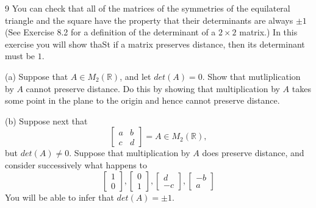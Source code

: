 \begin{problem}{9}
    You can check that all of the matrices of the 
    symmetries of the equilateral triangle and the 
    square have the property that their determinants 
    are always $\pm 1$ (See Exercise 8.2 for a 
    definition of the determinant of a $2 \times 2$
    matrix.) In this exercise you will show thaSt if a 
    matrix preserves distance, then its determinant 
    must be $1$.

    (a) Suppose that $A \in M_2(\mathbb{R})$, and let 
        $det(A) = 0$. Show that mutliplication by $A$ 
        cannot preserve distance. Do this by showing that 
        multiplication by $A$ takes some point in the plane 
        to the origin and hence cannot preserve distance.

    (b) Suppose next that 
        \[\begin{bmatrix}
            a & b \\
            c & d
        \end{bmatrix} = A \in M_2(\mathbb{R}),\]
        but $det(A) \ne 0$. Suppose that multiplication 
        by $A$ does preserve distance, and consider 
        successively what happens to 
        \[\begin{bmatrix}
            1 \\ 0
        \end{bmatrix},
        \begin{bmatrix}
            0 \\ 1
        \end{bmatrix}, 
        \begin{bmatrix}
            d \\ -c
        \end{bmatrix},
        \begin{bmatrix}
            -b \\ a
        \end{bmatrix}\]
        You will be able to infer that $det(A) = \pm 1$.
\end{problem}
\solved

